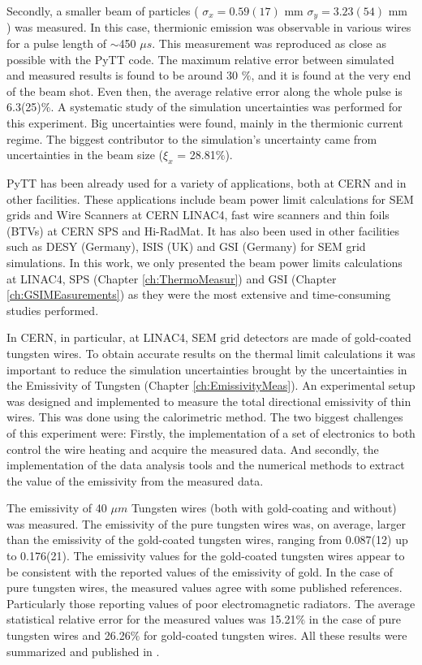 Secondly, a smaller beam of particles ( $\sigma_x = 0.59(17)$ mm $\sigma_y = 3.23(54)$ mm ) was measured. In this case, thermionic emission was observable in various wires for a pulse length of $\sim$450 $\mu s$. This measurement was reproduced as close as possible with the PyTT code. The maximum relative error between simulated and measured results is found to be around 30 $\%$, and it is found at the very end of the beam shot. Even then, the average relative error along the whole pulse is 6.3(25)$\%$. A systematic study of the simulation uncertainties was performed for this experiment. Big uncertainties were found, mainly in the thermionic current regime. The biggest contributor to the simulation’s uncertainty came from uncertainties in the beam size ($\xi_x$ = 28.81$\%$).  

PyTT has been already used for a variety of applications, both at CERN and in other facilities. These applications include beam power limit calculations for SEM grids and Wire Scanners at CERN LINAC4, fast wire scanners and thin foils (BTVs) at CERN SPS and Hi-RadMat. It has also been used in other facilities such as DESY (Germany), ISIS (UK) and GSI (Germany) for SEM grid simulations. In this work, we only presented the beam power limits calculations at LINAC4, SPS (Chapter \ref{ch:ThermoMeasur}) and GSI (Chapter \ref{ch:GSIMEasurements}) as they were the most extensive and time-consuming studies performed. 

In CERN, in particular, at LINAC4, SEM grid detectors are made of gold-coated tungsten wires. To obtain accurate results on the thermal limit calculations it was important to reduce the simulation uncertainties brought by the uncertainties in the Emissivity of Tungsten (Chapter \ref{ch:EmissivityMeas}). An experimental setup was designed and implemented to measure the total directional emissivity of thin wires. This was done using the calorimetric method. The two biggest challenges of this experiment were: Firstly, the implementation of a set of electronics to both control the wire heating and acquire the measured data. And secondly, the implementation of the data analysis tools and the numerical methods to extract the value of the emissivity from the measured data. 

The emissivity of 40 $\mu m$ Tungsten wires (both with gold-coating and without) was measured. The emissivity of the pure tungsten wires was, on average, larger than the emissivity of the gold-coated tungsten wires, ranging from 0.087(12) up to 0.176(21). The emissivity values for the gold-coated tungsten wires appear to be consistent with the reported values of the emissivity of gold. In the case of pure tungsten wires, the measured values agree with some published references. Particularly those reporting values of poor electromagnetic radiators. The average statistical relative error for the measured values was 15.21$\%$ in the case of pure tungsten wires and 26.26$\%$ for gold-coated tungsten wires. All these results were summarized and published in \parencite[][]{ref:IBIC2022Araceli}.  

